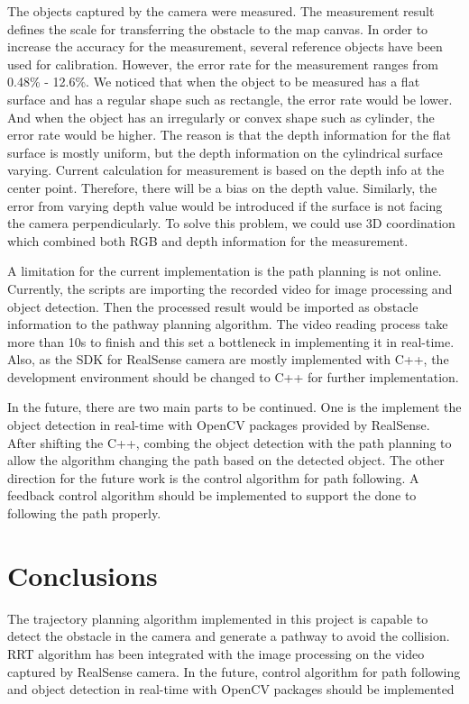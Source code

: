 \documentclass[
  oneside]{ubcthesis}
\begin{document}
The objects captured by the camera were measured. The measurement result defines the scale for transferring the obstacle to the map canvas. In order to increase the accuracy for the measurement, several reference objects have been used for calibration. However, the error rate for the measurement ranges from 0.48\% - 12.6\%. We noticed that when the object to be measured has a flat surface and has a regular shape such as rectangle, the error rate would be lower. And when the object has an irregularly or convex shape such as cylinder, the error rate would be higher. The reason is that the depth information for the flat surface is mostly uniform, but the depth information on the cylindrical surface varying. Current calculation for measurement is based on the depth info at the center point. Therefore, there will be a bias on the depth value. Similarly, the error from varying depth value would be introduced if the surface is not facing the camera perpendicularly. To solve this problem, we could use 3D coordination which combined both RGB and depth information for the measurement.

A limitation for the current implementation is the path planning is not online. Currently, the scripts are importing the recorded video for image processing and object detection. Then the processed result would be imported as obstacle information to the pathway planning algorithm. The video reading process take more than 10s to finish and this set a bottleneck in implementing it in real-time. Also, as the SDK for RealSense camera are mostly implemented with C++, the development environment should be changed to C++ for further implementation.

In the future, there are two main parts to be continued. One is the implement the object detection in real-time with OpenCV packages provided by RealSense. After shifting the C++, combing the object detection with the path planning to allow the algorithm changing the path based on the detected object. The other direction for the future work is the control algorithm for path following. A feedback control algorithm should be implemented to support the done to following the path properly.

\hypertarget{conclusions}{%
\chapter{Conclusions}\label{conclusions}}

The trajectory planning algorithm implemented in this project is capable to detect the obstacle in the camera and generate a pathway to avoid the collision. RRT algorithm has been integrated with the image processing on the video captured by RealSense camera. In the future, control algorithm for path following and object detection in real-time with OpenCV packages should be implemented

  
\end{document}

